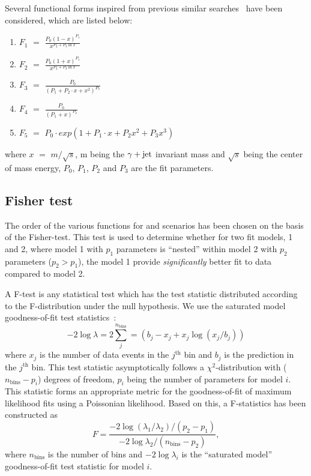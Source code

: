 Several functional forms inspired from previous similar searches~\cite{Aaltonen:2008dn, Harris:2011bh, ATLAS:2011ai, Chatrchyan:2013qha, Aad:2013cva, CMS_qstartogammaJet_8TeV} have been considered, which are listed below:
\vspace{-0.1in}
\begin{enumerate}[leftmargin=*]
\item $F_{1}$ $=$ $\frac{P_{0}(1 - x)^{P_{1}}}{x^{P_{2} + P_{3} \ln{x}}}$
\item $F_{2}$ $=$ $\frac{P_{0}(1 + x)^{P_{1}}}{x^{P_{2} + P_{3} \ln{x}}}$
\item $F_{3}$ $=$ $\frac{P_{0}}{(P_{1}+P_{2} \cdot x+x^{2})^{P_{3}}}$
\item $F_{4}$ $=$ $\frac{P_{0}}{(P_{1}+x)^{P_{2}}}$
\item $F_{5}$ $=$ $P_{0} \cdot exp(1+P_{1} \cdot x+P_{2}x^{2}+P_{3}x^{3})$
\end{enumerate}
\vspace{-0.1in}
where $x$ $=$ $m/\sqrt{s}$, m being the $\gamma+\mathrm{jet}$ invariant mass and $\sqrt{s}$ being the center of mass energy, $P_0$, $P_1$, $P_2$ and $P_3$ are the fit parameters. 

\subsection{Fisher test}
The order of the various functions for \qstar and \bstar scenarios has been chosen on the basis of the Fisher-test.
This test is used to determine whether for two fit models,
1 and 2, where model 1 with $p_{1}$ parameters is ``nested'' within model 2 with $p_{2}$ parameters ($p_{2} > p_{1}$), the model 1 provide
\textit{significantly} better fit to data compared to model 2. 

A F-test is any statistical test which has the test statistic distributed according to the F-distribution under the null hypothesis.
We use the saturated model goodness-of-fit test statistics~\cite{Likelihood, PRD}:
\begin{equation}
-2 \log {\lambda} = 2\sum_{j}^{n_{\textrm{bins}}} = (b_{j} - x_{j} + x_{j}\log(x_{j}/b_{j}))
\label{eq:chi2lambda}
\end{equation}
where $x_{j}$ is the number of data events in the $j^{\textrm{th}}$ bin and $b_{j}$ is the prediction in the $j^{\textrm{th}}$ bin.
This test statistic asymptotically follows a $\chi^{2}$-distribution with ($n_{\textrm{bins}} - p_{i}$) degrees of
freedom, $p_{i}$ being the number of parameters for model $i$. This statistic forms an appropriate metric for the goodness-of-fit of
maximum likelihood fits using a Poissonian likelihood. Based on this, a F-statistics has been constructed as
\begin{equation}
F = \frac{-2 \log ({\lambda_{1}}/{\lambda_{2}})/(p_{2}-p_{1})}{-2 \log {\lambda_{2}}/(n_{\textrm{bins}}-p_{2})},
\label{eq:fdef}
\end{equation}
where $n_{\textrm{bins}}$ is the number of bins and $-2 \log {\lambda_{i}}$ is the ``saturated model'' goodness-of-fit test statistic for model $i$.

